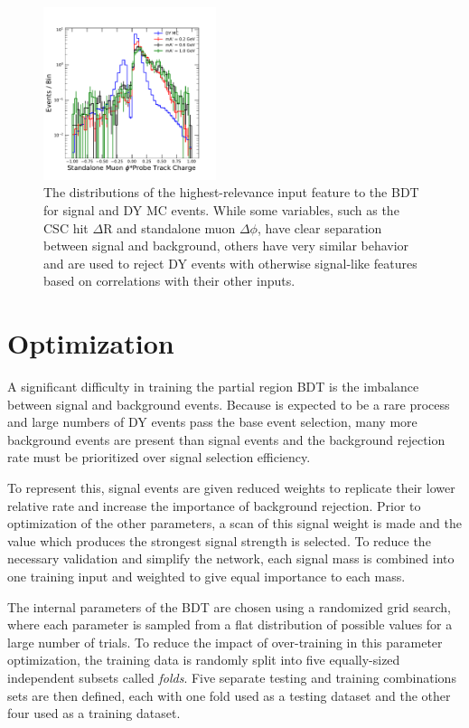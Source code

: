 \begin{figure}[htpb]
	\includegraphics[width=0.45\textwidth]{figures/bdtInputFeatsstaPhi.pdf}
	\caption[Input BDT Classification Features]{The distributions of the highest-relevance input feature to the BDT for signal and DY MC events. While some variables, such as the CSC hit $\Delta$R and standalone muon $\Delta\phi$, have clear separation between signal and background, others have very similar behavior and are used to reject DY events with otherwise signal-like features based on correlations with their other inputs.}
	\label{fig:bdtFeatures}
\end{figure}

\section{Optimization}
A significant difficulty in training the partial region BDT is the imbalance between signal and background events. 
Because \dbrem is expected to be a rare process and large numbers of DY events pass the base event selection, many more background events are present than signal events and the background rejection rate must be prioritized over signal selection efficiency.

To represent this, signal events are given reduced weights to replicate their lower relative rate and increase the importance of background rejection.
Prior to optimization of the other parameters, a scan of this signal weight is made and the value which produces the strongest signal strength is selected.
To reduce the necessary validation and simplify the network, each signal mass is combined into one training input and weighted to give equal importance to each mass.

The internal parameters of the BDT are chosen using a randomized grid search, where each parameter is sampled from a flat distribution of possible values for a large number of trials.
To reduce the impact of over-training in this parameter optimization, the training data is randomly split into five equally-sized independent subsets called \emph{folds}.
Five separate testing and training combinations sets are then defined, each with one fold used as a testing dataset and the other four used as a training dataset.

